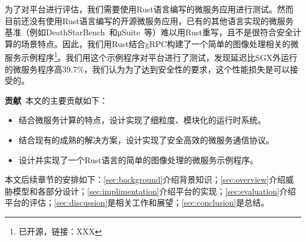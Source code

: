 为了对平台进行评估，我们需要使用Rust语言编写的微服务应用进行测试。然而目前还没有使用Rust语言编写的开源微服务应用，已有的其他语言实现的微服务基准（例如DeathStarBench~\cite{gan2019open}和μSuite~\cite{sriraman2018mu}等）难以用Rust重写，且不是很符合安全计算的场景特点。因此，我们用Rust结合gRPC构建了一个简单的图像处理相关的微服务示例程序\footnote{已开源，链接：XXX}。我们用这个示例程序对平台进行了测试，发现延迟比SGX外运行的微服务程序高39.7\%，我们认为为了达到安全性的要求，这个性能损失是可以接受的。

\textbf{贡献}\ 本文的主要贡献如下：
\begin{itemize}
    \item 结合微服务计算的特点，设计实现了细粒度、模块化的运行时系统。
    \item 结合现有的成熟的解决方案，设计实现了安全高效的微服务通信协议。
    \item 设计并实现了一个Rust语言的简单的图像处理的微服务示例程序。
\end{itemize}

本文后续章节的安排如下：\cref{sec:background}介绍背景知识；\cref{sec:overview}介绍威胁模型和各部分设计；\cref{sec:implimentation}介绍平台的实现；\cref{sec:evaluation}介绍平台的评估；\cref{sec:discussion}是相关工作和展望；\cref{sec:conclusion}是总结。



